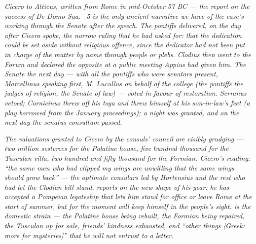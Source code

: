 
\textit{Cicero to Atticus, written from Rome in mid-October
57 BC --- the report on the success of \textit{De Domo Sua}.
--5 is the only ancient narrative we have of
the case's working through the Senate after the speech.
The pontiffs delivered, on the day after Cicero spoke, the
narrow ruling that he had asked for: that the dedication
could be set aside without religious offence, since the
dedicator had not been put in charge of the matter by name
through people or plebs. Clodius then went to the Forum and
declared the opposite at a public meeting Appius had given
him. The Senate the next day --- with all the pontiffs who
were senators present, Marcellinus speaking first, M. Lucullus
on behalf of the college (the pontiffs the judges of religion,
the Senate of law) --- voted in favour of restoration. Serranus
vetoed; Cornicinus threw off his toga and threw himself at
his son-in-law's feet (a play borrowed from the January
proceedings); a night was granted, and on the next day the
senatus consultum passed.}

\textit{The valuations granted to Cicero by the consuls'
council are visibly grudging --- two million sesterces for
the Palatine house, five hundred thousand for the Tusculan
villa, two hundred and fifty thousand for the Formian.
Cicero's reading: ``the same men who had clipped my wings
are unwilling that the same wings should grow back''
--- the optimate consulars led by Hortensius and the rest
who had let the Clodian bill stand.  reports
on the new shape of his year: he has accepted a Pompeian
legateship that lets him stand for office or leave Rome at
the start of summer, but for the moment will keep himself
in the people's sight.  is the domestic
strain --- the Palatine house being rebuilt, the Formian
being repaired, the Tusculan up for sale, friends' kindness
exhausted, and ``other things \textit{[Greek: more for
mysteries]}'' that he will not entrust to a letter.}
